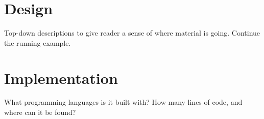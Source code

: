 \section{Design}
\label{sec:design}
Top-down descriptions to give reader a sense of where material is going.
Continue the running example.

\section{Implementation}
\label{sec:impl}
What programming languages is it built with?
How many lines of code, and where can it be found?